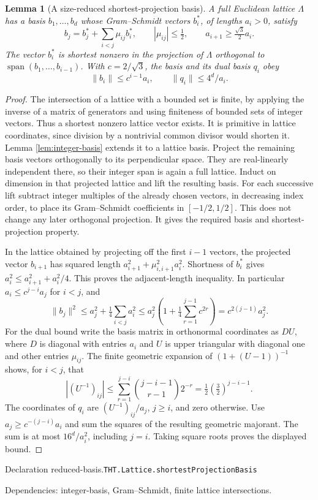 \documentclass[11pt]{article}
\newtheorem{lemma}[theorem]{Lemma}
\theoremstyle{definition}
\numberwithin{equation}{section}
\newcommand{\bp}[3]{\par\smallskip\begingroup\footnotesize
\noindent\hypertarget{bp:#1}{\textsf{Declaration #1.}}\quad\nolinkurl{#2}\par
\noindent\textsf{Dependencies:} #3.\par\endgroup\smallskip}
\begin{document}
\begin{lemma}[A size-reduced shortest-projection basis]\label{lem:reduced-basis}
A full Euclidean lattice $\Lambda$ has a basis $b_1,\ldots,b_d$ whose Gram--Schmidt vectors $b_i^*$, of lengths $a_i>0$, satisfy
\[
 b_j=b_j^*+\sum_{i<j}\mu_{ij}b_i^*,\qquad |\mu_{ij}|\le\tfrac12,
 \qquad a_{i+1}\ge\tfrac{\sqrt3}{2}a_i.
\]
The vector $b_i^*$ is shortest nonzero in the projection of $\Lambda$ orthogonal to $\operatorname{span}(b_1,\ldots,b_{i-1})$. With $c=2/\sqrt3$, the basis and its dual basis $q_i$ obey
\[
 \|b_i\|\le c^{i-1}a_i,\qquad \|q_i\|\le 4^d/a_i.
\]
\end{lemma}
\begin{proof}
The intersection of a lattice with a bounded set is finite, by applying the inverse of a matrix of generators and using finiteness of bounded sets of integer vectors. Thus a shortest nonzero lattice vector exists. It is primitive in lattice coordinates, since division by a nontrivial common divisor would shorten it. Lemma \ref{lem:integer-basis} extends it to a lattice basis. Project the remaining basis vectors orthogonally to its perpendicular space. They are real-linearly independent there, so their integer span is again a full lattice. Induct on dimension in that projected lattice and lift the resulting basis. For each successive lift subtract integer multiples of the already chosen vectors, in decreasing index order, to place its Gram--Schmidt coefficients in $[-1/2,1/2]$. This does not change any later orthogonal projection. It gives the required basis and shortest-projection property.

In the lattice obtained by projecting off the first $i-1$ vectors, the projected vector $b_{i+1}$ has squared length $a_{i+1}^2+\mu_{i,i+1}^2a_i^2$. Shortness of $b_i^*$ gives $a_i^2\le a_{i+1}^2+a_i^2/4$. This proves the adjacent-length inequality. In particular $a_i\le c^{j-i}a_j$ for $i<j$, and
\[
 \|b_j\|^2\le a_j^2+\tfrac14\sum_{i<j}a_i^2
 \le a_j^2\left(1+\tfrac14\sum_{r=1}^{j-1}c^{2r}\right)
 =c^{2(j-1)}a_j^2.
\]
For the dual bound write the basis matrix in orthonormal coordinates as $DU$, where $D$ is diagonal with entries $a_i$ and $U$ is upper triangular with diagonal one and other entries $\mu_{ij}$. The finite geometric expansion of $(1+(U-1))^{-1}$ shows, for $i<j$, that
\[
 |(U^{-1})_{ij}|\le\sum_{r=1}^{j-i}\binom{j-i-1}{r-1}2^{-r}
 =\tfrac12(\tfrac32)^{j-i-1}.
\]
The coordinates of $q_i$ are $(U^{-1})_{ij}/a_j$, $j\ge i$, and zero otherwise. Use $a_j\ge c^{-(j-i)}a_i$ and sum the squares of the resulting geometric majorant. The sum is at most $16^d/a_i^2$, including $j=i$. Taking square roots proves the displayed bound.
\end{proof}
\bp{reduced-basis}{THT.Lattice.shortestProjectionBasis}{integer-basis, Gram--Schmidt, finite lattice intersections}
\end{document}
